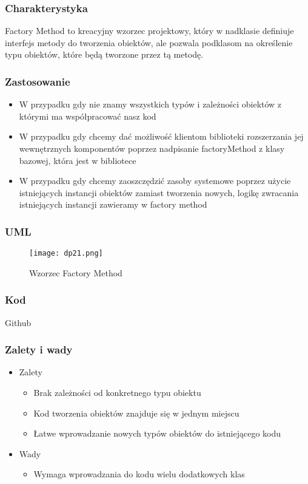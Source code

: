 \documentclass[a4paper,15pt]{article}
\begin{document}
\subsubsection{Charakterystyka}
Factory Method to kreacyjny wzorzec projektowy, który w nadklasie definiuje interfejs metody do tworzenia obiektów, ale pozwala podklasom na określenie typu obiektów, które będą tworzone przez tą metodę. 

\subsubsection{Zastosowanie}
\begin{itemize}
\item W przypadku gdy nie znamy wszystkich typów i zależności obiektów z którymi ma współpracować nasz kod
\item W przypadku gdy chcemy dać możliwość klientom biblioteki rozszerzania jej wewnętrznych komponentów poprzez nadpisanie factoryMethod z klasy bazowej, która jest w bibliotece
\item W przypadku gdy chcemy zaoszczędzić zasoby systemowe poprzez użycie istniejących instancji obiektów zamiast tworzenia nowych, logikę zwracania istniejących instancji zawieramy w factory method
\end{itemize}

\subsubsection{UML}

\begin{figure}[H]
\centering
  \texttt{[image: dp21.png]}
  \caption{Wzorzec Factory Method}
\end{figure}

\subsubsection{Kod}
Github

\subsubsection{Zalety i wady}


\begin{itemize}
\item Zalety
\begin{itemize}
\item Brak zależności od konkretnego typu obiektu
\item Kod tworzenia obiektów znajduje się w jednym miejscu
\item Łatwe wprowadzanie nowych typów obiektów do istniejącego kodu
\end{itemize}
\item Wady
\begin{itemize}
\item Wymaga wprowadzania do kodu wielu dodatkowych klas
\end{itemize}
\end{itemize}
\end{document}
